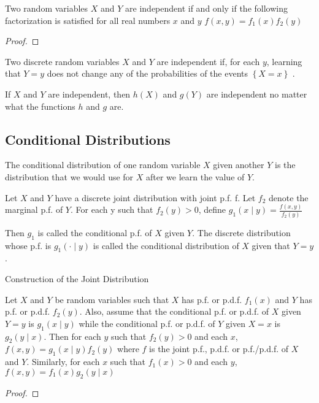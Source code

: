 \begin{corollary}
Two random variables $X$ and $Y$ are independent if and only if the following factorization is satisfied for all real numbers $x$ and $y$ $f\left(x,y\right)=f_{1}\left(x\right)f_{2}\left(y\right)$
\end{corollary}
\begin{proof}
\end{proof}

{\color{red} Two discrete random variables $X$ and $Y$ are independent if, for each $y$, learning that $Y=y$ does not change any of the probabilities of the events $\left\{ X=x\right\}$ .}

{\color{red} If $X$ and $Y$ are independent, then $h\left(X\right)$ and $g\left(Y\right)$ are independent no matter what the functions $h$ and $g$ are.}


\subsection{Conditional Distributions}

{\color{red} The conditional distribution of one random variable $X$ given another $Y$ is the distribution that we would use for $X$ after we learn the value of $Y$.}

\begin{definition}
Let $X$ and $Y$ have a discrete joint distribution with joint p.f. f. Let $f_{2}$ denote the marginal p.f. of $Y$. For each y such that $f_{2}\left(y\right)>0$, define $g_{1}\left(x\mid y\right)=\frac{f\left(x,y\right)}{f_{2}\left(y\right)}$
\end{definition}

{\color{red} Then $g_{1}$ is called the conditional p.f. of $X$ given $Y$. The discrete distribution whose p.f. is $g_{1}\left(\cdot\mid y\right)$ is called the conditional distribution of $X$ given that $Y=y$.}

{\color{red} Construction of the Joint Distribution}

\begin{proposition}
Let $X$ and $Y$ be random variables such that $X$ has p.f. or p.d.f. $f_{1}\left(x\right)$ and $Y$ has p.f. or p.d.f. $f_{2}\left(y\right)$. Also, assume that the conditional p.f. or p.d.f. of $X$ given $Y=y$ is $g_{1}\left(x\mid y\right)$ while the conditional p.f. or p.d.f. of $Y$ given $X=x$ is $g_{2}\left(y\mid x\right)$. Then for each $y$ such that $f_{2}\left(y\right)>0$ and each $x$, $f\left(x,y\right)=g_{1}\left(x\mid y\right)f_{2}\left(y\right)$ where $f$ is the joint p.f., p.d.f. or p.f./p.d.f. of $X$ and $Y$. Similarly, for each $x$ such that $f_{1}\left(x\right)>0$ and each $y$, $f\left(x,y\right)=f_{1}\left(x\right)g_{2}\left(y\mid x\right)$
\end{proposition}
\begin{proof}
\end{proof}

